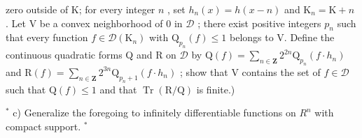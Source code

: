 zero outside of K; for every integer \(n\) , set \(h_n(x) = h(x - n)\) and \(\mathrm{K}_n = \mathrm{K} + n\) . Let V be a convex neighborhood of 0 in \(\mathcal{D}\) ; there exist positive integers \(p_n\) such that every function \(f \in \mathcal{D}(\mathrm{K}_n)\) with \(\mathrm{Q}_{p_n}(f) \leqslant 1\) belongs to V. Define the continuous quadratic forms Q and R on \(\mathcal{D}\) by \(\mathrm{Q}(f) = \sum_{n \in \mathbf{Z}} 2^{2n} \mathrm{Q}_{p_n}(f \cdot h_n)\) and \(\mathrm{R}(f) = \sum_{n \in \mathbf{Z}} 2^{3n} \mathrm{Q}_{p_n + 1}(f \cdot h_n)\) ; show that V contains the set of \(f \in \mathcal{D}\) such that \(\mathrm{Q}(f) \leqslant 1\) and that \(\operatorname{Tr}(\mathrm{R}/\mathrm{Q})\) is finite.)

\(^{*}\) c) Generalize the foregoing to infinitely differentiable functions on \(R^{n}\) with compact support. \(^{*}\)

